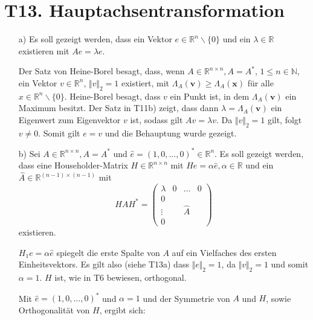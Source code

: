 \documentclass[11pt]{article}
\theoremstyle{plain}
\theoremstyle{definition}
\let\mbb\boldsymbol
\renewcommand\boldsymbol{\mbb}
\renewcommand{\a}{\"{a}}
\renewcommand{\u}{\"{u}}
\newcommand{\rayx}{\Lambda_A(\mbb{x})}
\newcommand{\rayv}{\Lambda_A(\mbb{v})}
\begin{document}
\section*{T13. Hauptachsentransformation}
\begin{itemize}
\item[a)]
Es soll gezeigt werden, dass ein Vektor $e\in \mathbb{R}^n \backslash \{0\}$ und ein $\lambda\in \mathbb{R}$ existieren mit $Ae=\lambda e$.

Der Satz von Heine-Borel besagt, dass, wenn  $A \in \mathbb{R}^{n \times n}, A=A^*$, $1 \leq n \in \mathbb{N}$, ein Vektor $v\in  \mathbb{R}^n$, $\Vert v\Vert_2 = 1$ existiert, mit $\rayv \geq \rayx$ f\u r alle $x\in \mathbb{R}^n \backslash \{0\}$. Heine-Borel besagt, dass $v$ ein Punkt ist, in dem $\rayv$ ein Maximum besitzt. Der Satz in T11b) zeigt, dass dann $\lambda = \rayv$ ein Eigenwert zum Eigenvektor $v$ ist, sodass gilt $Av=\lambda v$. Da $\Vert v\Vert_2 = 1$ gilt, folgt $v \neq 0$. Somit gilt $e=v$ und die Behauptung wurde gezeigt. 

\item[b)]
Sei $A \in \mathbb{R}^{n \times n}, A=A^*$ und $\hat{e} = (1, 0, ..., 0)^* \in \mathbb{R}^n$. Es soll gezeigt werden, dass eine Householder-Matrix $H \in \mathbb{R}^{n \times n}$ mit $He=\alpha \hat{e}, \alpha \in \mathbb{R}$ und ein $\hat{A} \in \mathbb{R}^{(n-1) \times (n-1)}$ mit
\begin{equation}
HAH^* =
\left(
\begin{array}{c|ccc}
\lambda & 0 & \hdots & 0    \\\hline
0  & & &                    \\
\vdots & & \hat{A} &        \\
0  & & &
\end{array}
\right)
\end{equation}
existieren.\vspace{0.3cm}

$H_1e = \alpha \hat{e}$ spiegelt die erste Spalte von $A$ auf ein Vielfaches des ersten Einheitsvektors. Es gilt also (siehe T13a) dass $\Vert e \Vert_2 = 1$, da $\Vert v \Vert_2 = 1$ und somit $\alpha=1$. $H$ ist, wie in T6 bewiesen, orthogonal.
 
Mit $\hat{e}=(1,0,\hdots,0)^*$ und $\alpha=1$ und der Symmetrie von $A$ und $H$, sowie Orthogonalit\a t von $H$, ergibt sich:


\end{itemize}
\end{document}
